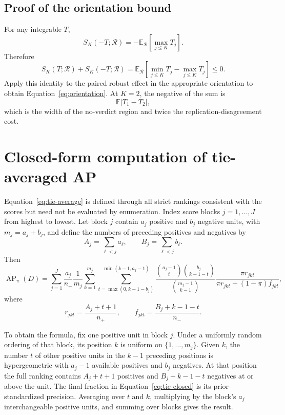 \documentclass[11pt]{article}
\newcommand{\AP}{\operatorname{AP}}
\newcommand{\Regime}{\mathcal{R}}
\newcommand{\E}{\mathbb{E}}
\newcommand{\APta}{\widetilde{\AP}}
\theoremstyle{remark}
\begin{document}
\subsection{Proof of the orientation bound}

For any integrable $T$,
\[
S_K(-T;\Regime)
=
-\E_{\Regime}\left[\max_{j\leq K}T_j\right].
\]
Therefore
\[
S_K(T;\Regime)+S_K(-T;\Regime)
=
\E_{\Regime}
\left[
\min_{j\leq K}T_j-\max_{j\leq K}T_j
\right]
\leq0.
\]
Apply this identity to the paired robust effect in the appropriate orientation to obtain Equation~\eqref{eq:orientation}. At $K=2$, the negative of the sum is
\[
\E|T_1-T_2|,
\]
which is the width of the no-verdict region and twice the replication-disagreement cost.

\section{Closed-form computation of tie-averaged AP}
\label{app:tie-computation}

Equation~\eqref{eq:tie-average} is defined through all strict rankings consistent with the scores but need not be evaluated by enumeration. Index score blocks $j=1,\ldots,J$ from highest to lowest. Let block $j$ contain $a_j$ positive and $b_j$ negative units, with $m_j=a_j+b_j$, and define the numbers of preceding positives and negatives by
\[
A_j=\sum_{\ell<j}a_\ell,
\qquad
B_j=\sum_{\ell<j}b_\ell.
\]
Then
\begin{equation}
\APta_\pi(D)
=
\sum_{j=1}^{J}
\frac{a_j}{n_+}\frac1{m_j}
\sum_{k=1}^{m_j}
\sum_{t=\max(0,k-1-b_j)}^{\min(k-1,a_j-1)}
\frac{\binom{a_j-1}{t}\binom{b_j}{k-1-t}}
{\binom{m_j-1}{k-1}}
\frac{\pi r_{jkt}}
{\pi r_{jkt}+(1-\pi)f_{jkt}},
\label{eq:tie-closed}
\end{equation}
where
\[
r_{jkt}=\frac{A_j+t+1}{n_+},
\qquad
f_{jkt}=\frac{B_j+k-1-t}{n_-}.
\]

To obtain the formula, fix one positive unit in block $j$. Under a uniformly random ordering of that block, its position $k$ is uniform on $\{1,\ldots,m_j\}$. Given $k$, the number $t$ of other positive units in the $k-1$ preceding positions is hypergeometric with $a_j-1$ available positives and $b_j$ negatives. At that position the full ranking contains $A_j+t+1$ positives and $B_j+k-1-t$ negatives at or above the unit. The final fraction in Equation~\eqref{eq:tie-closed} is its prior-standardized precision. Averaging over $t$ and $k$, multiplying by the block's $a_j$ interchangeable positive units, and summing over blocks gives the result.
\end{document}
